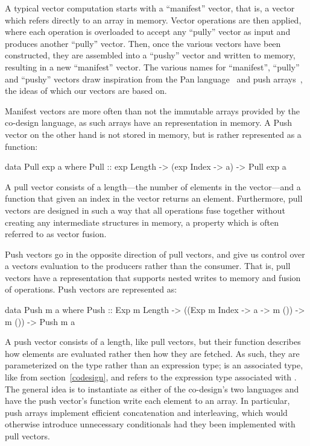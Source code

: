 \documentclass[../paper.tex]{subfiles}
\begin{document}
A typical vector computation starts with a ``manifest'' vector, that is, a vector which refers directly to an array in memory. Vector operations are then applied, where each operation is overloaded to accept any ``pully'' vector as input and produces another ``pully'' vector. Then, once the various vectors have been constructed, they are assembled into a ``pushy'' vector and written to memory, resulting in a new ``manifest'' vector. The various names for ``manifest'', ``pully'' and ``pushy'' vectors draw inspiration from the Pan language~\cite{elliott2003} and push arrays~\cite{claessen2012}, the ideas of which our vectors are based on.

Manifest vectors are more often than not the immutable arrays provided by the co-design language, as such arrays have an representation in memory. A Push vector on the other hand is not stored in memory, but is rather represented as a function:

\begin{code}
data Pull exp a where
  Pull :: exp Length -> (exp Index -> a) -> Pull exp a
\end{code}

\noindent A pull vector consists of a length---the number of elements in the vector---and a function that given an index in the vector returns an element. Furthermore, pull vectors are designed in such a way that all operations fuse together without creating any intermediate structures in memory, a property which is often referred to as vector fusion.

Push vectors go in the opposite direction of pull vectors, and give us control over a vectors evaluation to the producers rather than the consumer. That is, pull vectors have a representation that supports nested writes to memory and fusion of operations. Push vectors are represented as:

\begin{code}
data Push m a where
  Push :: Exp m Length -> ((Exp m Index -> a -> m ()) -> m ()) -> Push m a
\end{code}

\noindent A push vector consists of a length, like pull vectors, but their function describes how elements are evaluated rather then how they are fetched. As such, they are parameterized on the type  rather than an expression type;  is an associated type, like  from section~\ref{codesign}, and refers to the expression type associated with . The general idea is to instantiate  as either of the co-design's two languages and have the push vector's function write each element to an array. In particular, push arrays implement efficient concatenation and interleaving, which would otherwise introduce unnecessary conditionals had they been implemented with pull vectors.
\end{document}
